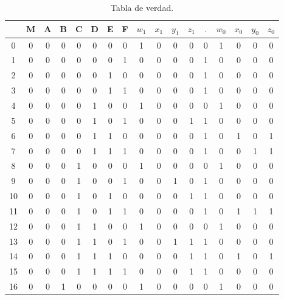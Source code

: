 \documentclass[12pt, oneside, openany]{article}
\begin{document}
{\sffamily

\begin{longtable}[c]{|c||c|c|c|c|c|c|c||c|c|c|c|c|c|c|c|c|}
    \caption{Tabla de verdad. \label{tab:tablaVerdad}} \\
    
    \hline
      & M & A & B & C & D & E & F &  $w_1$ & $x_1$ & $y_1$ & $z_1$ & $.$ & $w_0$ & $x_0$ & $y_0$ & $z_0$ \\
    \hline
    0 & 0 &  0 & 0 & 0 & 0 & 0 & 0 &  1 & 0 & 0 & 0 &  0 &  1 & 0 & 0 & 0 \\
    \hline
    1 & 0 &  0 & 0 & 0 & 0 & 0 & 1 &  0 & 0 & 0 & 0 &  1 &  0 & 0 & 0 & 0 \\
    \hline
    2 & 0 &  0 & 0 & 0 & 0 & 1 & 0 &  0 & 0 & 0 & 0 &  1 &  0 & 0 & 0 & 0 \\
    \hline
    3 & 0 &  0 & 0 & 0 & 0 & 1 & 1 &  0 & 0 & 0 & 0 &  1 &  0 & 0 & 0 & 0 \\
    \hline
    4 & 0 &  0 & 0 & 0 & 1 & 0 & 0 &  1 & 0 & 0 & 0 &  0 &  1 & 0 & 0 & 0 \\
    \hline
    5 & 0 &  0 & 0 & 0 & 1 & 0 & 1 &  0 & 0 & 0 & 1 &  1 &  0 & 0 & 0 & 0 \\
    \hline
    6 & 0 &  0 & 0 & 0 & 1 & 1 & 0 &  0 & 0 & 0 & 0 &  1 &  0 & 1 & 0 & 1 \\
    \hline
    7 & 0 &  0 & 0 & 0 & 1 & 1 & 1 &  0 & 0 & 0 & 0 &  1 &  0 & 0 & 1 & 1 \\
    \hline
    8 & 0 &  0 & 0 & 1 & 0 & 0 & 0 &  1 & 0 & 0 & 0 &  0 &  1 & 0 & 0 & 0 \\
    \hline
    9 & 0 &  0 & 0 & 1 & 0 & 0 & 1 &  0 & 0 & 1 & 0 &  1 &  0 & 0 & 0 & 0 \\
    \hline
    10 & 0 &  0 & 0 & 1 & 0 & 1 & 0 &  0 & 0 & 0 & 1 &  1 &  0 & 0 & 0 & 0 \\
    \hline
    11 & 0 &  0 & 0 & 1 & 0 & 1 & 1 &  0 & 0 & 0 & 0 &  1 &  0 & 1 & 1 & 1 \\
    \hline
    12 & 0 &  0 & 0 & 1 & 1 & 0 & 0 &  1 & 0 & 0 & 0 &  0 &  1 & 0 & 0 & 0 \\
    \hline
    13 & 0 &  0 & 0 & 1 & 1 & 0 & 1 &  0 & 0 & 1 & 1 &  1 &  0 & 0 & 0 & 0 \\
    \hline
    14 & 0 &  0 & 0 & 1 & 1 & 1 & 0 &  0 & 0 & 0 & 1 &  1 &  0 & 1 & 0 & 1 \\
    \hline
    15 & 0 &  0 & 0 & 1 & 1 & 1 & 1 &  0 & 0 & 0 & 1 &  1 &  0 & 0 & 0 & 0 \\
    \hline
    16 & 0 &  0 & 1 & 0 & 0 & 0 & 0 &  1 & 0 & 0 & 0 &  0 &  1 & 0 & 0 & 0 \\

\end{longtable}}
\end{document}
